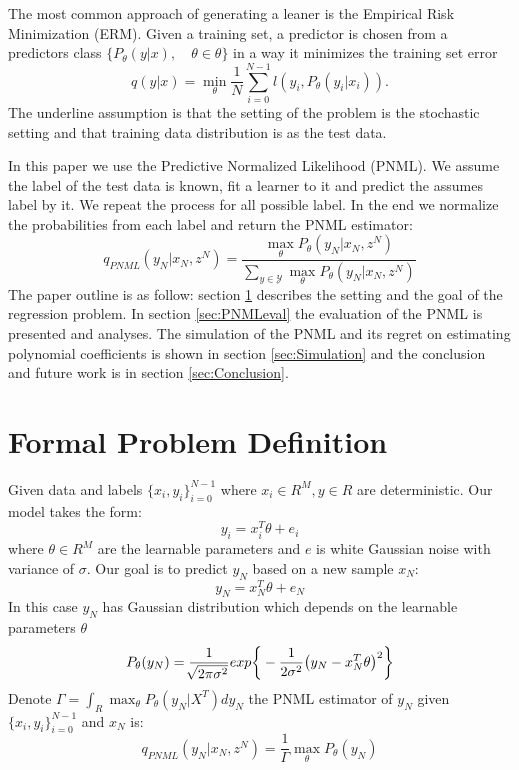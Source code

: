 \documentclass[letterpaper, 10 pt, conference]{ieeeconf}  %
\def\pnmlSingle{\max_{\theta} P_\theta (y_N|x_N, z^N)}
\begin{document}
The most common approach of generating a leaner is the Empirical Risk Minimization (ERM). Given a training set, a predictor is chosen from a predictors class $\{P_\theta(y|x) , \quad \theta \in \mathcal{\theta}\}$ in a way it minimizes the training set error 
\begin{equation}
    q(y|x) = \min_\theta \frac{1}{N}\sum_{i=0}^{N-1}  l(y_i,P_\theta(y_i|x_i)).
\end{equation}
The underline assumption is that the setting of the problem is the stochastic setting and that training data distribution is as the test data. 

In this paper we use the Predictive Normalized Likelihood (PNML). We assume the label of the test data is known, fit a learner to it and predict the assumes label by it. We repeat the process for all possible label. In the end we normalize the probabilities from each label and return the PNML estimator:
\begin{equation}
q_{PNML}(y_N|x_N,z^N)=\frac{\pnmlSingle}{\sum_{y\in \mathcal{Y}} \pnmlSingle}
\end{equation}
The paper outline is as follow:
section \ref{sec:FormalProblemDef} describes the setting and the goal of the regression problem. In section \ref{sec:PNMLeval} the evaluation of the PNML is presented and analyses. The simulation of the PNML and its regret on estimating polynomial coefficients is shown in section \ref{sec:Simulation} and the conclusion and future work is in section \ref{sec:Conclusion}.


\section{Formal Problem Definition} \label{sec:FormalProblemDef}
Given data and labels $\{x_i, y_i\}_{i=0}^{N-1}$ where $x_i \in R^M, y\in R$ are deterministic. Our model takes the form:
\begin{equation}
y_i=x_i^T \theta + e_i
\end{equation}
where $\theta \in R^M$ are the learnable parameters and $e$ is white Gaussian noise with variance of $\sigma$. Our goal is to predict $y_N$ based on a new sample $x_N$:
\begin{equation}
y_N = x_N^T \theta + e_N
\end{equation}
In this case $y_N$ has Gaussian distribution which depends on the learnable parameters $\theta$ 
\begin{equation}
P_{\theta}(y_N) 
=\frac{1}{\sqrt[]{2\pi\sigma^2}}exp\bigg\{-\frac{1}{2\sigma^2}\big(y_N- x_N^T\theta \big)^2\bigg\}  \\
\end{equation}
Denote $\Gamma=\int_R \max_{\theta} P_\theta(y_N|X^T)dy_N$ the PNML estimator of $y_N$ given $\{x_i,y_i\}_{i=0}^{N-1}$ and $x_N$ is:
\begin{equation} \label{eq:pnml_def}
q_{PNML}(y_N|x_N,z^N) = \frac{1}{\Gamma} \max_{\theta} P_\theta(y_N)
\end{equation}
\end{document}
